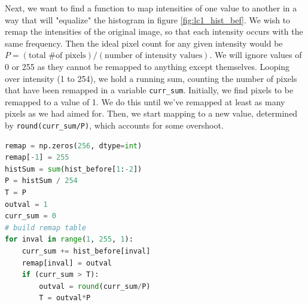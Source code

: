 \documentclass[11pt,a4paper]{article}
\begin{document}
Next, we want to find a function to map intensities of one value to another in a way that will "equalize" the histogram in figure \ref{fig:lc1_hist_bef}.
We wish to remap the intensities of the original image, so that each intensity occurs with the same frequency. Then the ideal pixel count for any given intensity would be $P = (\text{total \# of pixels}) / (\text{number of intensity values})$. We will ignore values of 0 or 255 as they cannot be remapped to anything except themselves. Looping over intensity (1 to 254), we hold a running sum, counting the number of pixels that have been remapped in a variable \verb|curr_sum|. Initially, we find pixels to be remapped to a value of 1. We do this until we've remapped at least as many pixels as we had aimed for. Then, we start mapping to a new value, determined by \verb|round(curr_sum/P)|, which accounts for some overshoot.

\pagebreak

\begin{lstlisting}[language=Python]
remap = np.zeros(256, dtype=int)
remap[-1] = 255
histSum = sum(hist_before[1:-2])
P = histSum / 254
T = P
outval = 1
curr_sum = 0
# build remap table
for inval in range(1, 255, 1):
    curr_sum += hist_before[inval]
    remap[inval] = outval
    if (curr_sum > T):
        outval = round(curr_sum/P)
        T = outval*P
\end{lstlisting}
\end{document}
